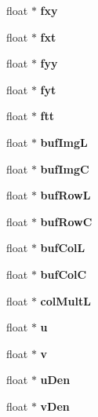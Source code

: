 \begin{DoxyCompactItemize}
\item 
float $\ast$ {\bfseries fxy}\label{classoFlow_aaf509f9ab6b2cd8561e769a3d0d47b33}

\item 
float $\ast$ {\bfseries fxt}\label{classoFlow_a8c47ddd2dc251e5e13c1b1ced5d408f0}

\item 
float $\ast$ {\bfseries fyy}\label{classoFlow_aea2fd8c813cd16654745e265ea6781e2}

\item 
float $\ast$ {\bfseries fyt}\label{classoFlow_ab7167d541ca76c8766ed0b9cac04691e}

\item 
float $\ast$ {\bfseries ftt}\label{classoFlow_ab5ef1a837104cad537fe3ff2e9b665f5}

\item 
float $\ast$ {\bfseries buf\+Img\+L}\label{classoFlow_a0abb73d2790e403e4ac78dc4c5c3be77}

\item 
float $\ast$ {\bfseries buf\+Img\+C}\label{classoFlow_af0b6ed1b3b3f31a91812306c164e26da}

\item 
float $\ast$ {\bfseries buf\+Row\+L}\label{classoFlow_a2842a4106fb17ff76a12dbaa9e1ed3d8}

\item 
float $\ast$ {\bfseries buf\+Row\+C}\label{classoFlow_a7364649b3e263b357ac0aa0725fbc2d4}

\item 
float $\ast$ {\bfseries buf\+Col\+L}\label{classoFlow_a68c4280903183a058be9ba09aa65251c}

\item 
float $\ast$ {\bfseries buf\+Col\+C}\label{classoFlow_a13ea8daf35e905a15173a778895d3751}

\item 
float $\ast$ {\bfseries col\+Mult\+L}\label{classoFlow_ae56fb93d897a19c2369e1ab4fbda55be}

\item 
float $\ast$ {\bfseries u}\label{classoFlow_a18a41637bb05346ce296b2049b123d16}

\item 
float $\ast$ {\bfseries v}\label{classoFlow_a7bcc4249f0db2faa3bb00ffc7384d6fa}

\item 
float $\ast$ {\bfseries u\+Den}\label{classoFlow_ad996c70db90e5cfbb3f3a6cabfa318ae}

\item 
float $\ast$ {\bfseries v\+Den}\label{classoFlow_abe530d8b95d5aeba41b82d3862b59bb9}


\end{DoxyCompactItemize}
